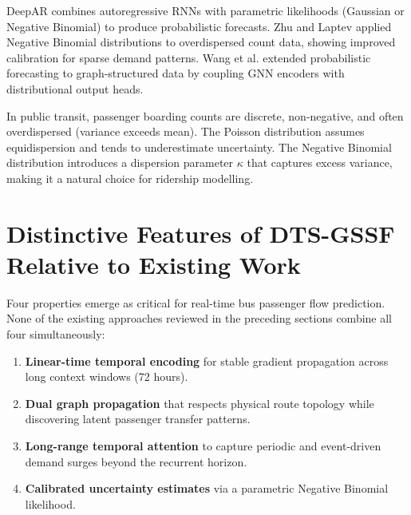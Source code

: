 DeepAR \cite{salinas2020deepar} combines autoregressive RNNs with parametric likelihoods (Gaussian or Negative Binomial) to produce probabilistic forecasts. Zhu and Laptev \cite{zhu2017deep} applied Negative Binomial distributions to overdispersed count data, showing improved calibration for sparse demand patterns. Wang et al. \cite{wang2021probabilistic} extended probabilistic forecasting to graph-structured data by coupling GNN encoders with distributional output heads.

In public transit, passenger boarding counts are discrete, non-negative, and often overdispersed (variance exceeds mean). The Poisson distribution assumes equidispersion and tends to underestimate uncertainty. The Negative Binomial distribution introduces a dispersion parameter $\kappa$ that captures excess variance, making it a natural choice for ridership modelling.

\section{Distinctive Features of DTS-GSSF Relative to Existing Work}
\label{sec:positioning}

Four properties emerge as critical for real-time bus passenger flow prediction. None of the existing approaches reviewed in the preceding sections combine all four simultaneously:

\begin{enumerate}
    \item \textbf{Linear-time temporal encoding} for stable gradient propagation across long context windows (72 hours).
    \item \textbf{Dual graph propagation} that respects physical route topology while discovering latent passenger transfer patterns.
    \item \textbf{Long-range temporal attention} to capture periodic and event-driven demand surges beyond the recurrent horizon.
    \item \textbf{Calibrated uncertainty estimates} via a parametric Negative Binomial likelihood.
\end{enumerate}

